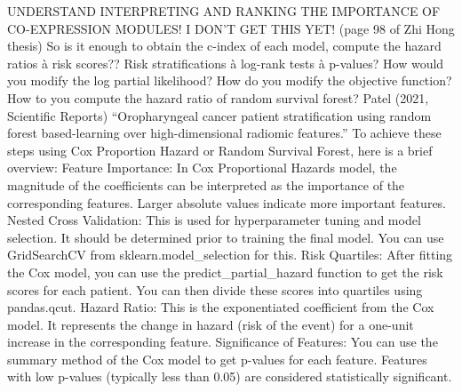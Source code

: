 \documentclass{article}%
\begin{document}
%
UNDERSTAND INTERPRETING AND RANKING THE IMPORTANCE OF CO{-}EXPRESSION MODULES! I DON’T GET THIS YET! (page 98 of Zhi Hong thesis) %
\newline%
\newline%
%
So is it enough to obtain the c{-}index of each model, compute the hazard ratios à risk scores?? Risk stratifications à log{-}rank tests à p{-}values? How would you modify the log partial likelihood? How do you modify the objective function? How to you compute the hazard ratio of random survival forest? %
\newline%
\newline%
%
Patel (2021, Scientific Reports) “Oropharyngeal cancer patient stratification using random forest based{-}learning over high{-}dimensional radiomic features.” %
\newline%
\newline%
%
To achieve these steps using Cox Proportion Hazard or Random Survival Forest, here is a brief overview: %
\newline%
\newline%
%
Feature Importance: In Cox Proportional Hazards model, the magnitude of the coefficients can be interpreted as the importance of the corresponding features. Larger absolute values indicate more important features.%
\newline%
\newline%
%
Nested Cross Validation: This is used for hyperparameter tuning and model selection. It should be determined prior to training the final model. You can use GridSearchCV from sklearn.model\_selection for this.%
\newline%
\newline%
%
Risk Quartiles: After fitting the Cox model, you can use the predict\_partial\_hazard function to get the risk scores for each patient. You can then divide these scores into quartiles using pandas.qcut.%
\newline%
\newline%
%
Hazard Ratio: This is the exponentiated coefficient from the Cox model. It represents the change in hazard (risk of the event) for a one{-}unit increase in the corresponding feature.%
\newline%
\newline%
%
Significance of Features: You can use the summary method of the Cox model to get p{-}values for each feature. Features with low p{-}values (typically less than 0.05) are considered statistically significant.%
\newline%
\newline%
\end{document}
